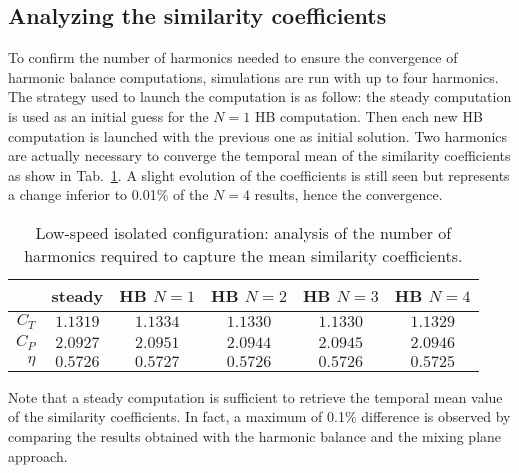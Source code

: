 \subsection{Analyzing the similarity coefficients}
\label{sub:dream_ls_conv_hb_sim_coeff}
To confirm the number of harmonics needed to ensure the convergence
of harmonic balance computations, simulations are run with up to four
harmonics. The strategy used to launch the computation is as follow:
the steady computation is used as an initial guess for the $N=1$ HB computation.
Then each new HB computation is launched with the previous one as initial
solution.
Two harmonics are actually necessary to converge the temporal mean 
of the similarity coefficients as show 
in Tab.~\ref{tab:dream_ls_hb_conv_sim}. A slight evolution of the
coefficients is still seen but represents a change inferior to 0.01\%
of the $N=4$ results, hence the convergence. 
\begin{table}[htp]
   \centering
  \begin{tabular}{rccccc}
    \toprule
    & steady & HB $N=1$ & HB $N=2$ & HB $N=3$ & HB $N=4$ \\
    \midrule
    $C_T$  & $1.1319$ & $1.1334$ & $1.1330$ & $1.1330$ & $1.1329$ \\
    $C_P$  & $2.0927$ & $2.0951$ & $2.0944$ & $2.0945$ & $2.0946$ \\
    $\eta$ & $0.5726$ & $0.5727$ & $0.5726$ & $0.5726$ & $0.5725$ \\
    \bottomrule
  \end{tabular}
  \caption{Low-speed isolated configuration: analysis of the number of harmonics
  required to capture the mean similarity coefficients.}
  \label{tab:dream_ls_hb_conv_sim}
\end{table}
Note that a steady computation is sufficient to retrieve
the temporal mean value of the similarity coefficients.
In fact, a maximum of 0.1\% difference is observed by
comparing the results obtained with the harmonic balance and the
mixing plane approach.

